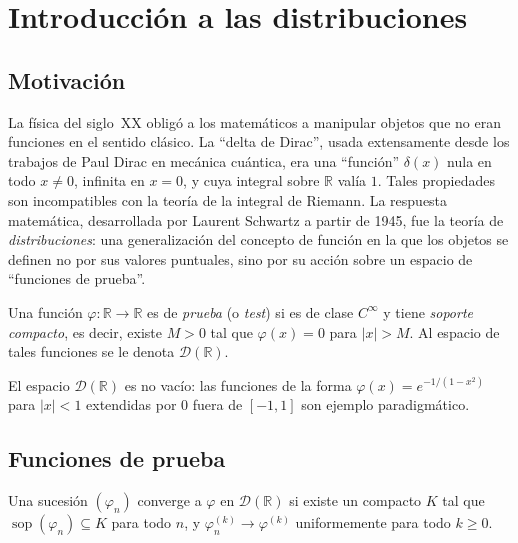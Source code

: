 \chapter{Introducción a las distribuciones}
\label{ch:distribuciones}

\section{Motivación}

La física del siglo~XX obligó a los matemáticos a manipular objetos que no eran funciones en el sentido clásico. La ``delta de Dirac'', usada extensamente desde los trabajos de Paul Dirac en mecánica cuántica, era una ``función'' $\delta(x)$ nula en todo $x\neq 0$, infinita en $x=0$, y cuya integral sobre $\mathbb{R}$ valía $1$. Tales propiedades son incompatibles con la teoría de la integral de Riemann. La respuesta matemática, desarrollada por Laurent Schwartz a partir de 1945, fue la teoría de \emph{distribuciones}: una generalización del concepto de función en la que los objetos se definen no por sus valores puntuales, sino por su acción sobre un espacio de ``funciones de prueba''.

\begin{definition}
\label{def:funcion-prueba}
Una función $\varphi\colon\mathbb{R}\to\mathbb{R}$ es de \emph{prueba} (o \emph{test}) si es de clase $C^{\infty}$ y tiene \emph{soporte compacto}, es decir, existe $M>0$ tal que $\varphi(x)=0$ para $|x|>M$. Al espacio de tales funciones se le denota $\mathcal{D}(\mathbb{R})$.
\end{definition}

El espacio $\mathcal{D}(\mathbb{R})$ es no vacío: las funciones de la forma $\varphi(x)=e^{-1/(1-x^2)}$ para $|x|<1$ extendidas por $0$ fuera de $[-1,1]$ son ejemplo paradigmático.

\section{Funciones de prueba}

\begin{definition}
\label{def:convergencia-prueba}
Una sucesión $(\varphi_n)$ converge a $\varphi$ en $\mathcal{D}(\mathbb{R})$ si existe un compacto $K$ tal que $\operatorname{sop}(\varphi_n)\subseteq K$ para todo $n$, y $\varphi_n^{(k)}\to\varphi^{(k)}$ uniformemente para todo $k\geq 0$.
\end{definition}

